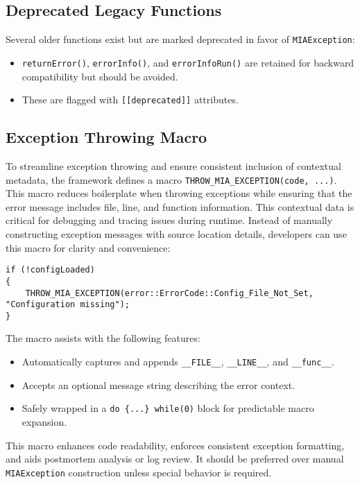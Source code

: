 \subsection*{Deprecated Legacy Functions}
Several older functions exist but are marked deprecated in favor of \texttt{MIAException}:
\begin{itemize}
	\item \texttt{returnError()}, \texttt{errorInfo()}, and \texttt{errorInfoRun()} are retained for backward compatibility but should be avoided.
	\item These are flagged with \texttt{[[deprecated]]} attributes.
\end{itemize}


\subsection*{Exception Throwing Macro}
To streamline exception throwing and ensure consistent inclusion of contextual metadata, the framework defines a macro \texttt{THROW_MIA_EXCEPTION(code, ...)}. This macro reduces boilerplate when throwing exceptions while ensuring that the error message includes file, line, and function information. This contextual data is critical for debugging and tracing issues during runtime. Instead of manually constructing exception messages with source location details, developers can use this macro for clarity and convenience:
\begin{lstlisting}[style=cppstyle]
if (!configLoaded)
{
    THROW_MIA_EXCEPTION(error::ErrorCode::Config_File_Not_Set, "Configuration missing");
}
\end{lstlisting}
The macro assists with the following features:
\begin{itemize}
    \item Automatically captures and appends \texttt{\_\_FILE\_\_}, \texttt{\_\_LINE\_\_}, and \texttt{\_\_func\_\_}.
    \item Accepts an optional message string describing the error context.
    \item Safely wrapped in a \texttt{do \{...\} while(0)} block for predictable macro expansion.
\end{itemize}
This macro enhances code readability, enforces consistent exception formatting, and aids postmortem analysis or log review. It should be preferred over manual \texttt{MIAException} construction unless special behavior is required.



